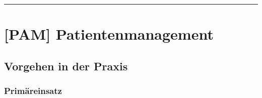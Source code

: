 \vspace{2em}

\hrule












\chapter{[PAM] Patientenmanagement}
\section{Vorgehen in der Praxis}

\subsection{Primäreinsatz}



